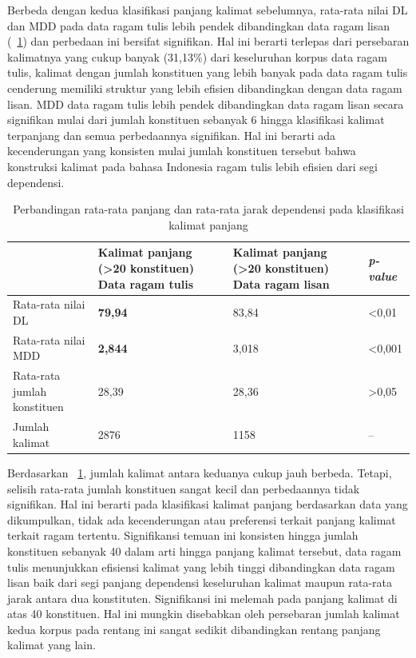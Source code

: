 Berbeda dengan kedua klasifikasi panjang kalimat sebelumnya, rata-rata nilai DL dan MDD pada data ragam tulis lebih pendek dibandingkan data ragam lisan (\tab~\ref{tab:DL_MDD_panjang}) dan perbedaan ini bersifat signifikan. Hal ini berarti terlepas dari persebaran kalimatnya yang cukup banyak (31,13\%) dari keseluruhan korpus data ragam tulis, kalimat dengan jumlah konstituen yang lebih banyak pada data ragam tulis cenderung memiliki struktur yang lebih efisien dibandingkan dengan data ragam lisan. MDD data ragam tulis lebih pendek dibandingkan data ragam lisan secara signifikan mulai dari jumlah konstituen sebanyak 6 hingga klasifikasi kalimat terpanjang dan semua perbedaannya signifikan. Hal ini berarti ada kecenderungan yang konsisten mulai jumlah konstituen tersebut bahwa konstruksi kalimat pada bahasa Indonesia ragam tulis lebih efisien dari segi dependensi.

\begin{table}
\begin{center}
\begin{small}
\caption{Perbandingan rata-rata panjang dan rata-rata jarak dependensi pada klasifikasi kalimat panjang}  \label{tab:DL_MDD_panjang}
\begin{tabular}{ | p{3.2cm} | p{3.2cm} | p{3.2cm} | p{2cm} |}
    \hline
 & Kalimat panjang \newline (\textgreater20 konstituen) \newline Data ragam tulis & Kalimat panjang \newline (\textgreater20 konstituen) \newline Data ragam lisan & \textit{p-value} \\ \hline
 Rata-rata nilai DL & \textbf{79,94} & 83,84 & \textless 0,01 \\ \hline
 Rata-rata nilai MDD & \textbf{2,844} & 3,018 & \textless 0,001 \\ \hline
 Rata-rata jumlah konstituen & 28,39 & 28,36 & \textgreater 0,05 \\ \hline
 Jumlah kalimat & 2876 & 1158 & -- \\ \hline
   \end{tabular}
   \end{small}
\end{center}
\end{table}

Berdasarkan \tab~\ref{tab:DL_MDD_panjang}, jumlah kalimat antara keduanya cukup jauh berbeda. Tetapi, selisih rata-rata jumlah konstituen sangat kecil dan perbedaannya tidak signifikan. Hal ini berarti pada klasifikasi kalimat panjang berdasarkan data yang dikumpulkan, tidak ada kecenderungan atau preferensi terkait panjang kalimat terkait ragam tertentu. Signifikansi temuan ini konsisten hingga jumlah konstituen sebanyak 40 dalam arti hingga panjang kalimat tersebut, data ragam tulis menunjukkan efisiensi kalimat yang lebih tinggi dibandingkan data ragam lisan baik dari segi panjang dependensi keseluruhan kalimat maupun rata-rata jarak antara dua konstituten. Signifikansi ini melemah pada panjang kalimat di atas 40 konstituen. Hal ini mungkin disebabkan oleh persebaran jumlah kalimat kedua korpus pada rentang ini sangat sedikit dibandingkan rentang panjang kalimat yang lain.  

